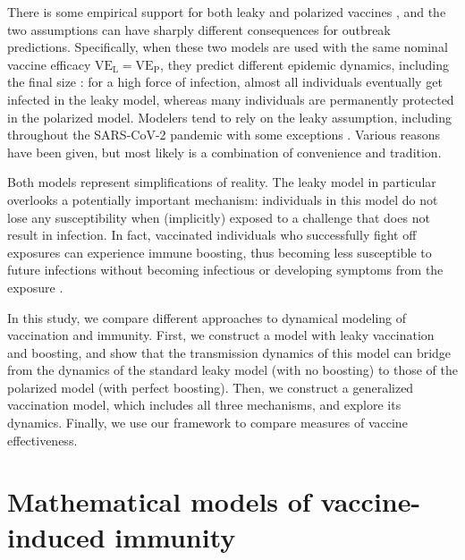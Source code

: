 \documentclass[12pt]{article}
\newcommand{\VE}{\ensuremath{\mathrm{VE}}}
\newcommand{\VEP}{\ensuremath{\VE_{\mathrm{P}}}}
\newcommand{\VEL}{\ensuremath{\VE_{\mathrm{L}}}}
\begin{document}
There is some empirical support for both leaky \citep{lind2023evidence} and polarized vaccines \citep{langwig2017vaccine}, and the two assumptions can have sharply different consequences for outbreak predictions.
Specifically, when these two models are used with the same nominal vaccine efficacy $\VEL = \VEP$, they predict different epidemic dynamics, including the final size \citep{smith1984assessment}:
for a high force of infection, almost all individuals eventually get infected in the leaky model, whereas many individuals are permanently protected in the polarized model.
Modelers tend to rely on the leaky assumption, including throughout the SARS-CoV-2 pandemic \citep{dyson2021possible,gozzi2021importance,marziano2021vaccine,matrajt2021vaccine,park2022intermediate} with some exceptions \citep{bubar2021model,buckner2021dynamic}.
Various reasons have been given, but most likely is a combination of convenience and tradition.

Both models represent simplifications of reality.
The leaky model in particular overlooks a potentially important mechanism: individuals in this model do not lose any susceptibility when (implicitly) exposed to a challenge that does not result in infection. 
In fact, vaccinated individuals who successfully fight off exposures can experience immune boosting, thus becoming less susceptible to future infections without becoming infectious or developing symptoms from the exposure \citep{lavine2011natural,yang2020waning}.

In this study, we compare different approaches to dynamical modeling of vaccination and immunity.
First, we construct a model with leaky vaccination and boosting, and show that the transmission dynamics of this model can bridge from the dynamics of the standard leaky model (with no boosting) to those of the polarized model (with perfect boosting). 
Then, we construct a generalized vaccination model, which includes all three mechanisms, and explore its dynamics.
Finally, we use our framework to compare measures of vaccine effectiveness.

\section*{Mathematical models of vaccine-induced immunity}
\end{document}
